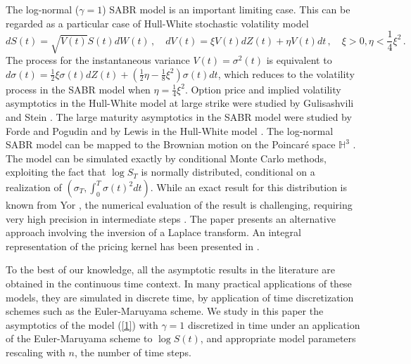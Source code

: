 \documentclass[11pt]{article}
\numberwithin{equation}{section}
\theoremstyle{plain}
\begin{document}
The log-normal ($\gamma=1$) SABR model is an important limiting case. 
This can be regarded as a particular case of Hull-White stochastic
volatility model \cite{HW1987}
\begin{equation}
dS(t) = \sqrt{V(t)} S(t) dW(t)\,,\quad 
dV(t) = \xi V(t) dZ(t) + \eta V(t) dt\,,\quad \xi>0, \eta < \frac14\xi^2\,.
\end{equation}
The process for the instantaneous variance 
$V(t) = \sigma^2(t)$ is equivalent to 
$d\sigma(t) = \frac12 \xi \sigma(t) dZ(t) + (\frac12 \eta - \frac18 \xi^2) 
\sigma(t) dt$,
which reduces to the volatility process in the SABR model when 
$\eta=\frac14\xi^2$.
Option price and implied volatility asymptotics in the Hull-White model
at large strike were studied by Gulisashvili and Stein \cite{GS1,GS2,Gulbook}.
The large maturity asymptotics in the SABR model were studied by Forde and 
Pogudin \cite{Forde1} and by Lewis in the Hull-White model \cite{Lewis2002}.
The log-normal SABR model can be mapped to the Brownian motion on the
Poincar\'e space $\mathbb{H}^3$ \cite{HLbook,Lewis2017}. 
The model can be simulated exactly by conditional Monte Carlo methods, 
exploiting the fact that $\log S_T$
is normally distributed, conditional on a realization of 
$(\sigma_T , \int_0^T \sigma(t)^2 dt)$.
While an exact result for this distribution is known from Yor \cite{Yor},
the numerical evaluation of the result is challenging, requiring very 
high precision in intermediate steps \cite{CaiSongChen}.
The paper \cite{CaiSongChen} presents an alternative approach 
involving the inversion of a Laplace transform. 
An integral representation of the pricing
kernel has been presented in \cite{Lewis2017}.

To the best of our knowledge, all the asymptotic results in the literature
are obtained in the continuous time context. In many practical applications
of these models, they are simulated in discrete time, by application of
time discretization schemes such as the Euler-Maruyama scheme.
We study in this paper the asymptotics of the model (\ref{1}) with $\gamma=1$
discretized
in time under an application of the Euler-Maruyama scheme to $\log S(t)$,
and appropriate model parameters rescaling with $n$, the number of time steps.
\end{document}
